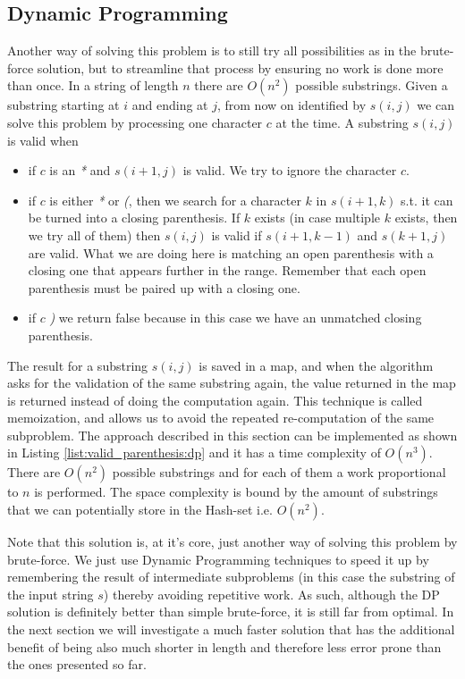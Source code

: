 

\subsection{Dynamic Programming}
\label{valid_parenthesis:sec:dp}
Another way of solving this problem is to still try all possibilities as in the brute-force solution, but to streamline that process by ensuring no work is done more than once. In a string of length $n$ there are $O(n^2)$ possible substrings. 
Given a substring starting at $i$ and ending at $j$, from now on identified by $s(i,j)$ we can solve this problem by processing one character $c$ at the time. A substring $s(i,j)$ is valid when
\begin{itemize}
	\item if $c$ is an \textit{*} and $s(i+1,j)$ is valid. We try to ignore the character $c$.
	\item if $c$ is either \textit{*} or \textit{(}, then we search for a character $k$ in $s(i+1,k)$ s.t. it can be turned into a closing parenthesis. If $k$ exists (in case multiple $k$ exists, then we try all of them) then $s(i,j)$ is valid if $s(i+1,k-1)$ and $s(k+1,j)$ are valid. What we are doing here is matching an open parenthesis with a closing one that appears further in the range. Remember that each open parenthesis must be paired up with a closing one.
	\item if $c$ \textit{)} we return false because in this case we have an unmatched closing parenthesis.
\end{itemize}
The result for a substring $s(i,j)$ is saved in a map, and when the algorithm asks for the validation of the same substring again, the value returned in the map is returned instead of doing the computation again. This technique is called memoization, and allows us to avoid the repeated re-computation of the same subproblem. The approach described in this section can be implemented as shown in Listing \ref{list:valid_parenthesis:dp} and it has a time complexity of $O(n^3)$. There are $O(n^2)$ possible substrings and for each of them a work proportional to $n$ is performed. The space complexity is bound by the amount of substrings that we can potentially store in the Hash-set i.e. $O(n^2)$.

Note that this solution is, at it's core, just another way of solving this problem by brute-force. We just use Dynamic Programming techniques to speed it up by remembering the result of intermediate subproblems (in  this case the substring of the input string $s$) thereby avoiding repetitive work.  As such, although the DP solution is definitely better than simple brute-force, it is still far from optimal.  In the next section we will investigate a much faster solution that has the additional benefit of being also much shorter in length and therefore less error prone than the ones presented so far.

